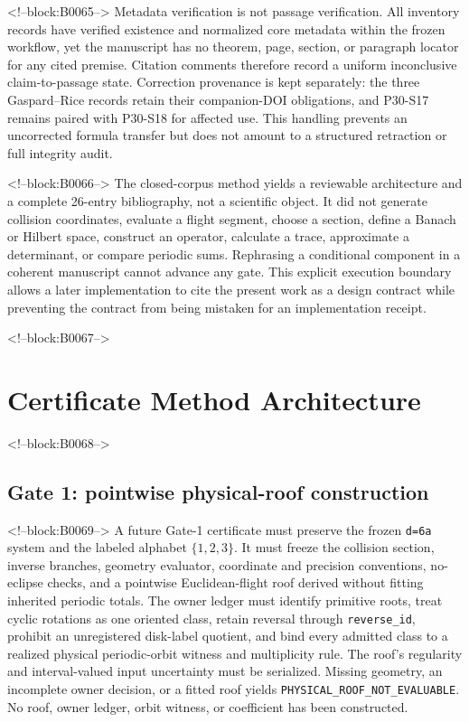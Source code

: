 \documentclass[11pt,a4paper]{article}
\begin{document}
<!--block:B0065-->
Metadata verification is not passage verification. All inventory records have verified existence and normalized core metadata within the frozen workflow, yet the manuscript has no theorem, page, section, or paragraph locator for any cited premise. Citation comments therefore record a uniform inconclusive claim-to-passage state. Correction provenance is kept separately: the three Gaspard--Rice records retain their companion-DOI obligations, and P30-S17 remains paired with P30-S18 for affected use. This handling prevents an uncorrected formula transfer but does not amount to a structured retraction or full integrity audit.

<!--block:B0066-->
The closed-corpus method yields a reviewable architecture and a complete 26-entry bibliography, not a scientific object. It did not generate collision coordinates, evaluate a flight segment, choose a section, define a Banach or Hilbert space, construct an operator, calculate a trace, approximate a determinant, or compare periodic sums. Rephrasing a conditional component in a coherent manuscript cannot advance any gate. This explicit execution boundary allows a later implementation to cite the present work as a design contract while preventing the contract from being mistaken for an implementation receipt.

<!--block:B0067-->
\section{Certificate Method Architecture}

<!--block:B0068-->
\subsection{Gate 1: pointwise physical-roof construction}

<!--block:B0069-->
A future Gate-1 certificate must preserve the frozen \texttt{d=6a} system and the labeled alphabet \(\{1,2,3\}\). It must freeze the collision section, inverse branches, geometry evaluator, coordinate and precision conventions, no-eclipse checks, and a pointwise Euclidean-flight roof derived without fitting inherited periodic totals. The owner ledger must identify primitive roots, treat cyclic rotations as one oriented class, retain reversal through \texttt{reverse\_id}, prohibit an unregistered disk-label quotient, and bind every admitted class to a realized physical periodic-orbit witness and multiplicity rule. The roof's regularity and interval-valued input uncertainty must be serialized. Missing geometry, an incomplete owner decision, or a fitted roof yields \texttt{PHYSICAL\_ROOF\_NOT\_EVALUABLE}. No roof, owner ledger, orbit witness, or coefficient has been constructed.
\end{document}
